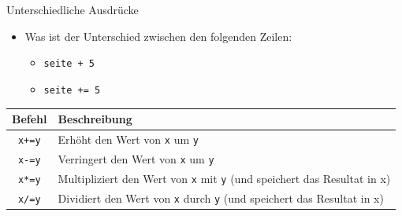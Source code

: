 \begin{frame}{Unterschiedliche Ausdrücke}
    \begin{itemize}
        \item Was ist der Unterschied zwischen den folgenden Zeilen:
              \begin{itemize}
                  \item \lstinline|seite + 5|
                  \item \lstinline|seite += 5|
              \end{itemize}
    \end{itemize}
    \begin{table}[H]
        \centering
        \begin{tabular}{c|p{6cm}}
            Befehl           & Beschreibung                                                                                 \\\midrule
            \lstinline|x+=y| & Erhöht den Wert von \lstinline|x| um \lstinline|y|                                           \\\hline
            \lstinline|x-=y| & Verringert den Wert von \lstinline|x| um \lstinline|y|                                       \\\hline
            \lstinline|x*=y| & Multipliziert den Wert von \lstinline|x| mit \lstinline|y| (und speichert das Resultat in x) \\\hline
            \lstinline|x/=y| & Dividiert den Wert von \lstinline|x| durch \lstinline|y| (und speichert das Resultat in x)
        \end{tabular}
    \end{table}
\end{frame}

